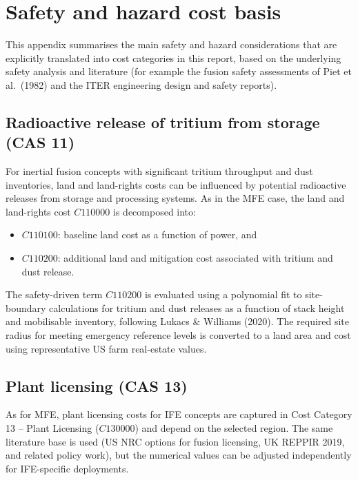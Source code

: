 \ifsafetycosts
\section{Safety and hazard cost basis}

This appendix summarises the main safety and hazard considerations that
are explicitly translated into cost categories in this report, based on
the underlying safety analysis and literature (for example the fusion
safety assessments of Piet et al.\ (1982)\cite{Piet1982Potential} and
the ITER engineering design and safety reports\cite{iter2001final,
baylor2019shattered}).

\subsection{Radioactive release of tritium from storage (CAS 11)}

For inertial fusion concepts with significant tritium throughput and
dust inventories, land and land-rights costs can be influenced by
potential radioactive releases from storage and processing systems. As
in the MFE case, the land and land-rights cost \(C110000\) is
decomposed into:
\begin{itemize}
  \item \(C110100\): baseline land cost as a function of power, and
  \item \(C110200\): additional land and mitigation cost associated with
        tritium and dust release.
\end{itemize}

The safety-driven term \(C110200\) is evaluated using a polynomial fit
to site-boundary calculations for tritium and dust releases as a
function of stack height and mobilisable inventory, following
Lukacs \& Williams (2020). The required site radius for meeting
emergency reference levels is converted to a land area and cost using
representative US farm real-estate values\cite{USDA2022LandValues}.

\subsection{Plant licensing (CAS 13)}

As for MFE, plant licensing costs for IFE concepts are captured in Cost
Category 13 – Plant Licensing (\(C130000\)) and depend on the selected
region. The same literature base is used (US NRC options for fusion
licensing, UK REPPIR 2019, and related policy work\cite{White2021Regulation,
NRCFusion2023,UKREPPIR2019,UKFusion2022}), but the numerical values can
be adjusted independently for IFE-specific deployments.

